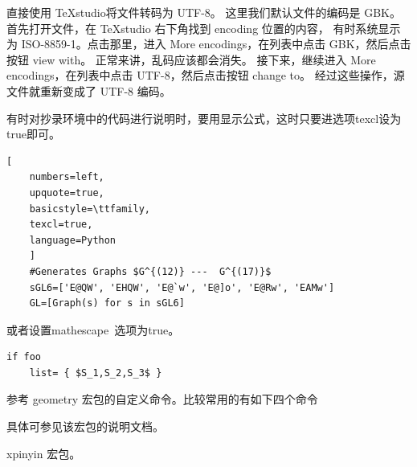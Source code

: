 直接使用 TeXstudio将文件转码为 UTF-8。
这里我们默认文件的编码是 GBK。首先打开文件，在 TeXstudio 右下角找到 encoding 位置的内容，
有时系统显示为 ISO-8859-1。点击那里，进入 More encodings，在列表中点击 GBK，然后点击按钮 view with。
正常来讲，乱码应该都会消失。 接下来，继续进入 More encodings，在列表中点击 UTF-8，然后点击按钮 change to。
经过这些操作，源文件就重新变成了 UTF-8 编码。



有时对抄录环境中的代码进行说明时，要用显示公式，这时只要进选项texcl设为true即可。

\begin{texlist}
  \begin{lstlisting}[
    numbers=left,
    upquote=true,
    basicstyle=\ttfamily,
    texcl=true,
    language=Python
    ]
    #Generates Graphs $G^{(12)} ---  G^{(17)}$
    sGL6=['E@QW', 'EHQW', 'E@`w', 'E@]o', 'E@Rw', 'EAMw']
    GL=[Graph(s) for s in sGL6]
  \end{lstlisting}
\end{texlist}
% 
% 

或者设置mathescape~选项为true。

\begin{texlist}
  \begin{lstlisting}[mathescape=true]
    if foo
    list= { $S_1,S_2,S_3$ }
  \end{lstlisting}
\end{texlist}





参考 geometry 宏包的自定义命令。比较常用的有如下四个命令
\begin{texlist}
  \restoregeometry
\end{texlist}
具体可参见该宏包的说明文档。



xpinyin 宏包。




